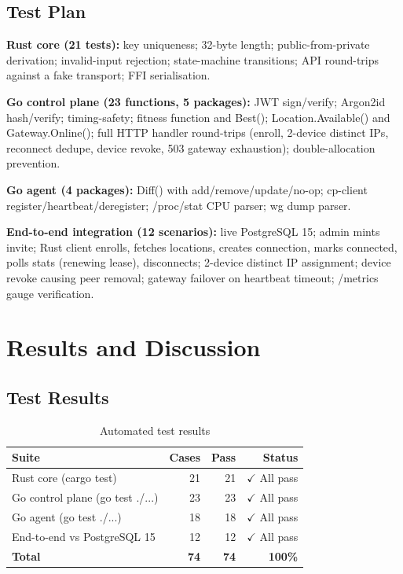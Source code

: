 \documentclass[12pt,a4paper]{report}
\begin{document}
\section{Test Plan}

\textbf{Rust core (21 tests):} key uniqueness; 32-byte length; public-from-private derivation; invalid-input rejection; state-machine transitions; API round-trips against a fake transport; FFI serialisation.

\textbf{Go control plane (23 functions, 5 packages):} JWT sign/verify; Argon2id hash/verify; timing-safety; fitness function and Best(); Location.Available() and Gateway.Online(); full HTTP handler round-trips (enroll, 2-device distinct IPs, reconnect dedupe, device revoke, 503 gateway exhaustion); double-allocation prevention.

\textbf{Go agent (4 packages):} Diff() with add/remove/update/no-op; cp-client register/heartbeat/deregister; /proc/stat CPU parser; wg dump parser.

\textbf{End-to-end integration (12 scenarios):} live PostgreSQL 15; admin mints invite; Rust client enrolls, fetches locations, creates connection, marks connected, polls stats (renewing lease), disconnects; 2-device distinct IP assignment; device revoke causing peer removal; gateway failover on heartbeat timeout; /metrics gauge verification.

\chapter{Results and Discussion}

\section{Test Results}

\begin{table}[H]
\centering\small
\caption{Automated test results}
\label{tab:tests}
\begin{tabular}{lrrr}
\toprule
\textbf{Suite} & \textbf{Cases} & \textbf{Pass} & \textbf{Status}\\
\midrule
Rust core (cargo test)           & 21 & 21 & $\checkmark$ All pass\\
Go control plane (go test ./...) & 23 & 23 & $\checkmark$ All pass\\
Go agent (go test ./...)         & 18 & 18 & $\checkmark$ All pass\\
End-to-end vs PostgreSQL 15      & 12 & 12 & $\checkmark$ All pass\\
\midrule
\textbf{Total} & \textbf{74} & \textbf{74} & \textbf{100\%}\\
\bottomrule
\end{tabular}
\end{table}
\end{document}
